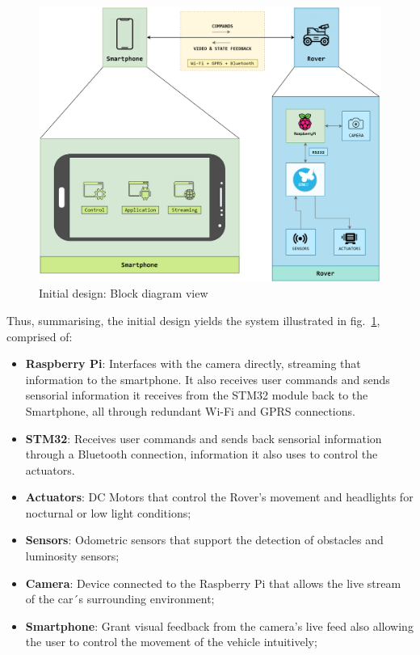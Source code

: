 \begin{figure}[!ht]
\centering
\includegraphics[width=1.0\textwidth]{./sec/img/initial_design_diagram.png}
\caption{\label{fig:initial-design}Initial design: Block diagram view}
\end{figure}

Thus, summarising, the initial design yields the system illustrated in
fig.~\ref{fig:initial-design}, comprised of:

\begin{itemize}
\item \textbf{ Raspberry Pi}: Interfaces with the camera directly, streaming that information to the smartphone. It also receives user commands and sends sensorial information it receives from the STM32 module back to the Smartphone, all through redundant Wi-Fi and GPRS connections.

\item \textbf{STM32}: Receives user commands and sends back sensorial information through a Bluetooth connection, information it also uses to control the actuators.

\item \textbf{Actuators}: DC Motors that control the Rover's movement and headlights for nocturnal or low light conditions;

\item \textbf{Sensors}: Odometric sensors that support the detection of obstacles and luminosity sensors;

\item \textbf{Camera}: Device connected to the Raspberry Pi that allows the live stream of the car´s surrounding environment;

\item \textbf{Smartphone}: Grant visual feedback from the camera's live feed also allowing the user to control the movement of the vehicle intuitively;

\end{itemize}

